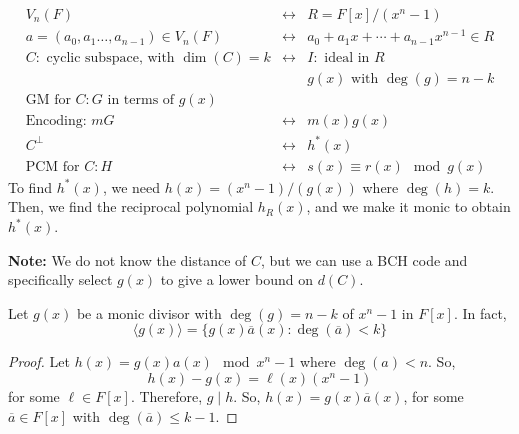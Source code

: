 
\[
    \begin{array}{ccc}
        V_n(F)                                      & \longleftrightarrow & R=F[x]/(x^n-1)                      \\
        a=(a_0,a_1\ldots ,a_{n-1})\in V_n(F)        & \longleftrightarrow & a_0+a_1x+\cdots+a_{n-1}x^{n-1}\in R \\
        C: \text{ cyclic subspace, with } \dim(C)=k & \longleftrightarrow & I:\text{ ideal in } R               \\
                                                    &                     & g(x) \text{ with } \deg(g)=n-k      \\
        \text{GM for } C: G \text{ in terms of } g(x)                                                           \\
        \text{Encoding: } mG                        & \longleftrightarrow & m(x)g(x)                            \\
        C^{\perp}                                   & \longleftrightarrow & h^*(x)                              \\
        \text{PCM for } C: H                        & \longleftrightarrow & s(x)\equiv r(x)\mod g(x)
    \end{array}
\]
To find $ h^*(x) $, we need $ h(x)=(x^n-1)/(g(x)) $ where $ \deg(h)=k $. Then,
we find the reciprocal polynomial $ h_R(x) $, and we make it monic to obtain
$ h^*(x) $.

\textbf{Note:} We do not know the distance of $ C $, but we can use a BCH
code and specifically select $ g(x) $ to give a lower bound on
$ d(C) $.

\begin{thmbox}
    \begin{lemma}
        Let $ g(x) $ be a monic divisor with $ \deg(g)=n-k $ of
        $ x^n-1 $ in $ F[x] $. In fact,
        \[ \langle g(x) \rangle = \{g(x)\overline{a}(x):\deg(\overline{a})<k\} \]
    \end{lemma}
\end{thmbox}

\begin{proof}
    Let $ h(x)=g(x)a(x)\mod x^n-1 $ where $ \deg(a)<n $. So,
    \[ h(x)-g(x)=\ell(x)(x^n-1) \]
    for some $ \ell \in F[x] $. Therefore, $ g\mid h $.
    So, $ h(x)=g(x)\overline{a}(x) $, for some $ \overline{a}\in F[x] $
    with $ \deg(\overline{a})\leqslant k-1 $.
\end{proof}

